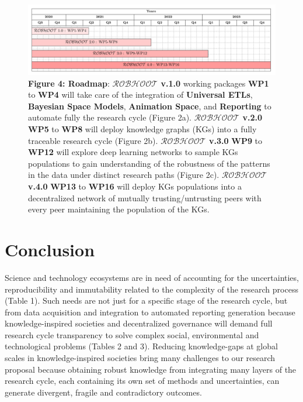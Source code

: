 \documentclass[10pt, a4paper, twocolumn]{article} %
\begin{document}
\begin{figure}[ht]
  \includegraphics[width=1\textwidth]{GanttChartWhitePaper.pdf}
  {\small {\bf Figure 4: Roadmap}: {\bf $\mathcal{ROBHOOT}$ v.1.0}
    working packages {\bf WP1} to {\bf WP4} will take care of the
    integration of {\bf Universal ETLs}, {\bf Bayesian Space Models},
    {\bf Animation Space}, and {\bf Reporting} to automate fully the
    research cycle (Figure 2a). {\bf $\mathcal{ROBHOOT}$ v.2.0} {\bf
      WP5} to {\bf WP8} will deploy knowledge graphs (KGs) into a
    fully traceable research cycle (Figure 2b). {\bf
      $\mathcal{ROBHOOT}$ v.3.0} {\bf WP9} to {\bf WP12} will explore
    deep learning networks to sample KGs populations to gain
    understanding of the robustness of the patterns in the data under
    distinct research paths (Figure 2c). {\bf $\mathcal{ROBHOOT}$
      v.4.0} {\bf WP13} to {\bf WP16} will deploy KGs populations into
    a decentralized network of mutually trusting/untrusting peers with
    every peer maintaining the population of the KGs.}
\end{figure}


\section{Conclusion}
Science and technology ecosystems are in need of accounting for the
uncertainties, reproducibility and immutability related to the
complexity of the research process (Table 1). Such needs are not just
for a specific stage of the research cycle, but from data acquisition
and integration to automated reporting generation because
knowledge-inspired societies and decentralized governance will demand
full research cycle transparency to solve complex social,
environmental and technological problems (Tables 2 and 3). Reducing
knowledge-gaps at global scales in knowledge-inspired societies bring
many challenges to our research proposal because obtaining robust
knowledge from integrating many layers of the research cycle, each
containing its own set of methods and uncertainties, can generate
divergent, fragile and contradictory outcomes.
\end{document}
